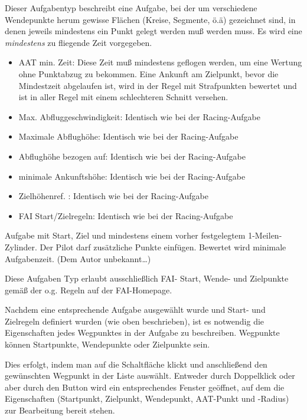 \begin{description}
\begin{itemize}
    \end{itemize}
\item[\p{AAT}]
 Dieser Aufgabentyp beschreibt eine  Aufgabe, bei der um verschiedene Wendepunkte herum gewisse Flächen (Kreise, Segmente, ö.ä) gezeichnet sind, in denen jeweils mindestens ein Punkt gelegt werden muß werden muss.
 Es wird eine \textsl{mindestens} zu fliegende Zeit vorgegeben.
    \begin{itemize}
            \item AAT min. Zeit:  Diese Zeit muß mindestens geflogen werden, um eine Wertung ohne Punktabzug zu bekommen. Eine Ankunft am Zielpunkt, bevor die Mindestzeit abgelaufen ist, wird in der Regel mit Strafpunkten bewertet und ist in aller Regel mit einem schlechteren Schnitt versehen.
        	\item Max. Abfluggeschwindigkeit: Identisch wie bei der Racing-Aufgabe
        	\item Maximale Abflughöhe: Identisch wie bei der Racing-Aufgabe
        	\item Abflughöhe bezogen auf: Identisch wie bei der Racing-Aufgabe
        	\item minimale Ankunftshöhe: Identisch wie bei der Racing-Aufgabe
        	\item Zielhöhenref. : Identisch wie bei der Racing-Aufgabe
        	\item FAI Start/Zielregeln: Identisch wie bei der Racing-Aufgabe
    \end{itemize}
    \item[\p{Modified Area Task (MAT)}] Aufgabe mit Start, Ziel und mindestens einem vorher festgelegtem 1-Meilen-Zylinder. Der Pilot darf zusätzliche Punkte einfügen. Bewertet wird minimale Aufgabenzeit. (Dem Autor unbekannt\dots) 
\item[\p{FAI Abzeichen/Rekorde}] Diese Aufgaben Typ erlaubt ausschließlich FAI- Start, Wende- und Zielpunkte gemäß der o.g. Regeln auf der FAI-Homepage.
\end{description}

Nachdem eine entsprechende Aufgabe ausgewählt wurde und Start- und Zielregeln definiert wurden (wie oben beschrieben), ist es notwendig die Eigenschaften jedes Wegpunktes in der Aufgabe zu beschreiben. Wegpunkte können Startpunkte, Wendepunkte oder Zielpunkte sein.

Dies erfolgt, indem man auf die  Schaltfläche klickt und anschließend den gewünschten Wegpunkt in der Liste auswählt. Entweder durch Doppelklick oder aber durch den Button  wird ein entsprechendes Fenster geöffnet, auf dem die Eigenschaften (Startpunkt, Zielpunkt, Wendepunkt, AAT-Punkt und -Radius) zur Bearbeitung bereit stehen.

